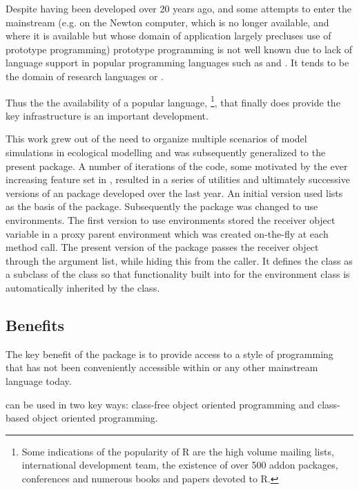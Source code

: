 \documentclass{Z}
\begin{document}
Despite having been developed over 20 years ago, and some attempts to
enter the mainstream (e.g.   
on the Newton computer, which
is no longer available, and  where 
it is available but whose
domain of application largely precluses use of prototype programming)
prototype programming is not well known due to lack of language
support in popular programming languages such as  and 
.  It tends
to be the domain of research languages or .

Thus the
the availability of a popular language,
 \footnote{Some indications of the popularity of R are
the high volume mailing lists, international development team, the
existence of over 500 addon packages, conferences and numerous books 
and papers devoted to R.},
that finally does provide the key infrastructure 
is an important development.

This work grew out of the need to organize multiple scenarios of model
simulations in ecological modelling \citep{Rnews:Petzoldt:2003} and
was subsequently generalized to the present package.  A number of
iterations of the code, some motivated by the ever increasing feature
set in , resulted in a series of utilities and ultimately
successive versions of an  package developed over the last
year.  An initial version used  lists as the basis of the
package.  Subsequently the package was changed to use 
environments.  The first version to use environments stored the
receiver object variable in a proxy parent environment which was
created on-the-fly at each method call.  The present version of
the  package passes the receiver object through the argument list,
while hiding this from the caller.  It defines the  class
as a subclass of the   class so that
functionality built into  for the environment class is
automatically inherited by the  class.

\subsection{Benefits}


The key benefit of the  package is to provide 
access to a style of programming that has not been conveniently
accessible within  or any other mainstream language today.

 can be used in two key ways: class-free object oriented programming
and class-based object oriented programming.  
\end{document}
